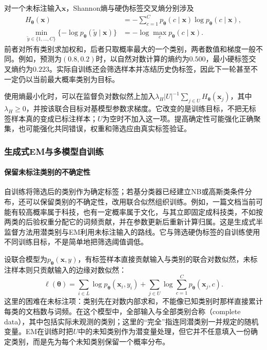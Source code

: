 对一个未标注输入$\bm{x}$，Shannon熵与硬伪标签交叉熵分别涉及
\begin{equation}
  \label{eq:classification-pseudolabel-entropy}
  \begin{aligned}
    H_{\bm{\theta}}(\bm{x})
      &=-\sum_{c=1}^{C}p_{\bm{\theta}}(c\mid\bm{x})
        \log p_{\bm{\theta}}(c\mid\bm{x}),\\
    \min_{\widetilde y\in\{1,\dots,C\}}
      \{-\log p_{\bm{\theta}}(\widetilde y\mid\bm{x})\}
      &=-\log\max_c p_{\bm{\theta}}(c\mid\bm{x}).
  \end{aligned}
\end{equation}
前者对所有类别求加权和，后者只取概率最大的一个类别，两者数值和梯度一般不同。例如，预测为$(0.8,0.2)$时，以自然对数计算的熵约为$0.500$，最小硬标签交叉熵约为$0.223$。实际自训练还会筛选样本并冻结历史伪标签，因此下一轮甚至不一定仍以当前最大概率类别为目标。

使用熵最小化时，可以在监督负对数似然上加入$\lambda_H|U|^{-1}\sum_{j\in U}H_{\bm\theta}(\bm x_j)$，其中$\lambda_H\geq0$，并按该联合目标对基模型参数求梯度。它改变的是训练目标，不把无标签样本真的变成已标注样本；$U$为空时不加入这一项。提高确定性可能强化正确聚集，也可能强化共同错误，权重和筛选应由真实标签验证。

\subsubsection{生成式EM与多模型自训练}

\paragraph{保留未标注类别的不确定性}
\label{sec:classification-self-training-soft-em}

自训练将筛选后的类别作为确定标签；若基分类器已经建立NB或高斯类条件分布，还可以保留类别的不确定性，改用联合似然组织训练。例如，一篇文档当前可能有较高概率属于科技，也有一定概率属于文化，与其立即固定成科技类，不如按两类的后验权重分配它的词频贡献，并在参数更新后重新计算归属。这是生成式半监督方法用潜类别与EM利用未标注输入的路线。它与筛选硬伪标签的自训练使用不同训练目标，不是简单地把筛选阈值调低。

设联合模型为$p_{\bm{\theta}}(\bm{x},y)$，有标签样本直接贡献输入与类别的联合对数似然，未标注样本则只贡献输入的边缘对数似然：
\[
  \ell(\bm{\theta})
  =\sum_{i\in L}\log p_{\bm{\theta}}(\bm{x}_i,y_i)
   +\sum_{j\in U}\log\sum_{c=1}^{C}
      p_{\bm{\theta}}(\bm{x}_j,c).
\]
这里的困难在未标注项：类别先在对数内部求和，不能像已知类别时那样直接累计每类的文档数与词频。在这个模型中，全部输入与全部类别合称（complete data），其中包括实际未观测的类别；这里的“完全”指连同潜类别一并规定的随机变量。EM在训练时把$U$中的未知类别作为潜变量处理，但它并不任意填入一份确定类别，而是先为每个未知类别保留一个概率分布。

